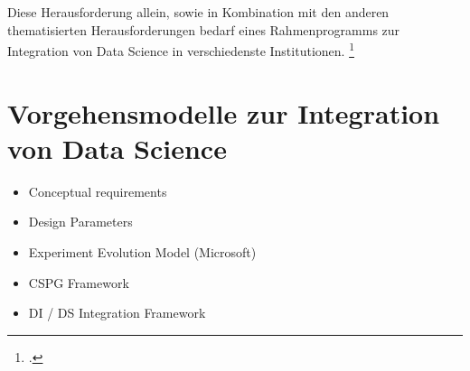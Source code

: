 Diese Herausforderung allein, sowie in Kombination mit den anderen thematisierten Herausforderungen bedarf eines Rahmenprogramms zur Integration von Data Science in verschiedenste Institutionen. \footcite[Vgl.][S. 1]{Saltz.2017}

\section{Vorgehensmodelle zur Integration von Data Science}

\begin{itemize}
    \item Conceptual requirements
    \item Design Parameters
    \item Experiment Evolution Model (Microsoft)
    \item CSPG Framework
    \item DI / DS Integration Framework
\end{itemize}